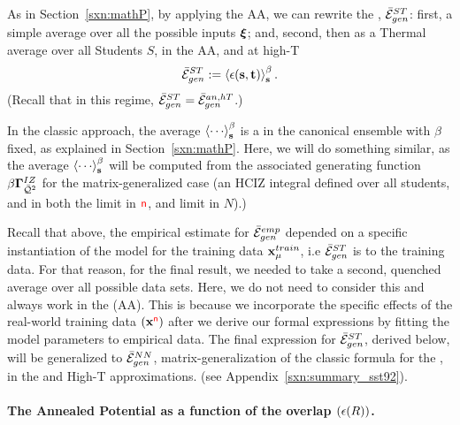 As in Section~\ref{sxn:mathP}, by applying the AA, we can rewrite the \AverageSTGeneralizationError, $\bar{\mathcal{E}}^{ST}_{gen}$:
first, a simple average over all the possible inputs $\boldsymbol{\xi}$; and, 
second, then as a Thermal average over all Students $S$, in the AA, and at high-T 
\begin{align}
\label{eqn:MGE}
\bar{\mathcal{E}}^{ST}_{gen}:=\left\langle \epsilon({\mathbf{s}}, {\mathbf{t}} ) \right\rangle_{\mathbf s}^{\beta} .
\end{align}
(Recall that in this regime, $\bar{\mathcal{E}}^{ST}_{gen}=\bar{\mathcal{E}}_{gen}^{an,hT}$.)

In the classic \STATMECH approach, the average $\THRMAVG{\cdots}$ is
a \ThermalAverage in the canonical ensemble with $\beta$ fixed,
as explained in Section~\ref{sxn:mathP}.  Here, we will do something similar, as the \Student
average $\THRMAVG{\cdots}$ will be computed from the associated
generating function $\beta\mathbf{\Gamma}^{IZ}_{\bar{\mathcal{Q}}^{2}}$ for the matrix-generalized case  (an HCIZ integral defined over all students,
and in both the \LargeN \Thermodynamic limit in ${\color{red}\sf{n}}$, and \WideLayer \LargeN  limit in $N$).)

Recall that above, the empirical estimate for $\bar{\mathcal{E}}^{emp}_{gen}$ depended on a
specific instantiation of the model for the training data $\mathbf{x}_{\mu}^{train}$,
i.e  $\bar{\mathcal{E}}^{ST}_{gen}$ is \Quenched to the training data.
For that reason, for the final result, we needed to take a second,
quenched average over all possible data sets.
Here, we do not need to consider this and always work in the \AnnealedApproximation(AA).
This is because we incorporate
the specific effects of the real-world training data $(\mathbf{x}^{{\color{red}\sf{n}}})$ after we derive our formal expressions
by fitting the model parameters to empirical data.
The final expression for $\bar{\mathcal{E}}^{ST}_{gen}$, derived below,
will be generalized to $\bar{\mathcal{E}}^{NN}_{gen}$, matrix-generalization of  the classic \STATMECH formula
for the \LinearPerceptron, in the \Annealed and High-T approximations.
(see Appendix~\ref{sxn:summary_sst92}). 

\paragraph{The Annealed Potential as a function of the overlap $(\epsilon(R))$.}

